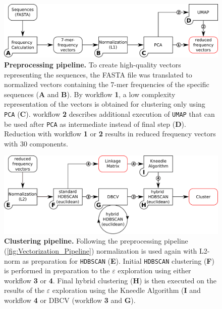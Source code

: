 \begin{figure}[!hbt]
    \centering
    \includegraphics[width=\textwidth]{Graphics/Vectorization.pdf}
    \caption[Preprocessing pipeline]{\textbf{Preprocessing pipeline.} To create high-quality vectors representing the sequences, the FASTA file was translated to normalized vectors containing the 7-mer frequencies of the specific sequences (\textsf{\textbf{A}} and \textsf{\textbf{B}}). By workflow \textsf{\textbf{1}}, a low complexity representation of the vectors is obtained for clustering only using \texttt{PCA} (\textsf{\textbf{C}}). workflow \textsf{\textbf{2}} describes additional execution of \texttt{UMAP} that can be used after \texttt{PCA} as intermediate instead of final step (\textsf{\textbf{D}}). Reduction with workflow \textsf{\textbf{1}} or \textsf{\textbf{2}} results in reduced frequency vectors with 30 components.} 
    \label{fig:Vectorization_Pipeline}
\end{figure}

\begin{figure}[!hbt]
    \centering
    \includegraphics[width=\textwidth]{Graphics/Clustering.pdf}
    \caption[Clustering pipeline]{\textbf{Clustering pipeline.} Following the preprocessing pipeline (\autoref{fig:Vectorization_Pipeline}) normalization is used again with L2-norm as preparation for \texttt{HDBSCAN} (\textsf{\textbf{E}}). Initial \texttt{HDBSCAN} clustering (\textsf{\textbf{F}}) is performed in preparation to the $\varepsilon$ exploration using either workflow \textsf{\textbf{3}} or \textsf{\textbf{4}}. Final hybrid clustering (\textsf{\textbf{H}}) is then executed on the results of the $\varepsilon$ exploration using the Kneedle Algorithm (\textsf{\textbf{I}} and workflow \textsf{\textbf{4}} or DBCV (workflow \textsf{\textbf{3}} and \textsf{\textbf{G}}).}
    \label{fig:Clustering_Pipeline}
\end{figure}

